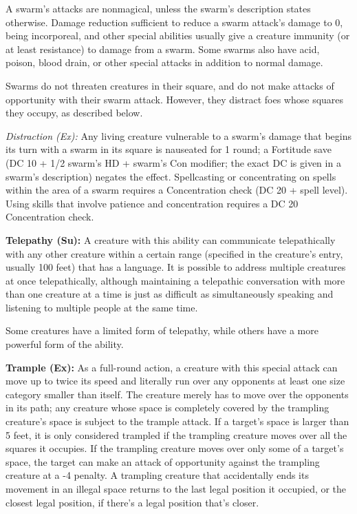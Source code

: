 \documentclass{article}
\begin{document}
A swarm's attacks are nonmagical, unless the swarm's description states otherwise. 
Damage reduction sufficient to reduce a swarm attack's damage to 0, being incorporeal, 
and other special abilities usually give a creature immunity (or at least resistance) 
to damage from a swarm. Some swarms also have acid, poison, blood drain, or other 
special attacks in addition to normal damage.

Swarms do not threaten creatures in their square, and do not make attacks of opportunity 
with their swarm attack. However, they distract foes whose squares they occupy, 
as described below.

\textit{Distraction (Ex): }Any living creature vulnerable to a swarm's damage that 
begins its turn with a swarm in its square is nauseated for 1 round; a Fortitude 
save (DC 10 + 1/2 swarm's HD + swarm's Con modifier; the exact DC is given in a 
swarm's description) negates the effect. Spellcasting or concentrating on spells 
within the area of a swarm requires a Concentration check (DC 20 + spell level). 
Using skills that involve patience and concentration requires a DC 20 Concentration 
check.

\vspace{12pt}
\textbf{Telepathy (Su):} A creature with this ability can communicate telepathically 
with any other creature within a certain range (specified in the creature's entry, 
usually 100 feet) that has a language. It is possible to address multiple creatures 
at once telepathically, although maintaining a telepathic conversation with more 
than one creature at a time is just as difficult as simultaneously speaking and 
listening to multiple people at the same time.

Some creatures have a limited form of telepathy, while others have a more powerful 
form of the ability.

\vspace{12pt}
\textbf{Trample (Ex):} As a full-round action, a creature with this special attack 
can move up to twice its speed and literally run over any opponents at least one 
size category smaller than itself. The creature merely has to move over the opponents 
in its path; any creature whose space is completely covered by the trampling creature's 
space is subject to the trample attack. If a target's space is larger than 5 feet, 
it is only considered trampled if the trampling creature moves over all the squares 
it occupies. If the trampling creature moves over only some of a target's space, 
the target can make an attack of opportunity against the trampling creature at 
a -4 penalty. A trampling creature that accidentally ends its movement in an illegal 
space returns to the last legal position it occupied, or the closest legal position, 
if there's a legal position that's closer.
\end{document}
